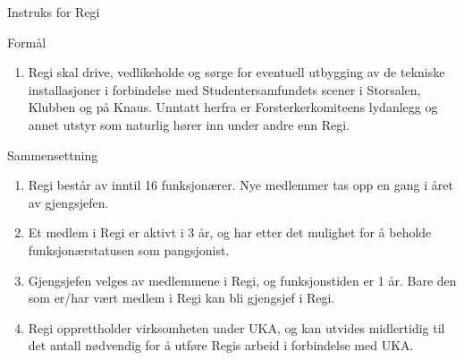 
\begin{instruks}{Instruks for Regi}{}{}

    \begin{instruksledd}{Formål}
        \begin{enumerate}
            \item Regi skal drive, vedlikeholde og sørge for eventuell utbygging av de
                tekniske installasjoner i forbindelse med
                Studentersamfundets scener i Storsalen, Klubben og på Knaus. Unntatt
                herfra er Forsterkerkomiteens
                lydanlegg og annet utstyr som naturlig hører inn under andre enn Regi.
        \end{enumerate}
    \end{instruksledd}

    \begin{instruksledd}{Sammensettning}
        \begin{enumerate}
            \item Regi består av inntil 16 funksjonærer. Nye medlemmer tas opp en gang i
                året av gjengsjefen.
            \item Et medlem i Regi er aktivt i 3 år, og har etter det mulighet for å
                beholde funksjonærstatusen som pangsjonist.
            \item Gjengsjefen velges av medlemmene i Regi, og funksjonstiden er 1 år.
                Bare den som er/har vært medlem i Regi kan bli gjengsjef i Regi.
            \item Regi opprettholder virksomheten under UKA, og kan utvides midlertidig
                til det antall nødvendig for å utføre Regis arbeid i forbindelse med UKA.
        \end{enumerate}
    \end{instruksledd}


\end{instruks}
